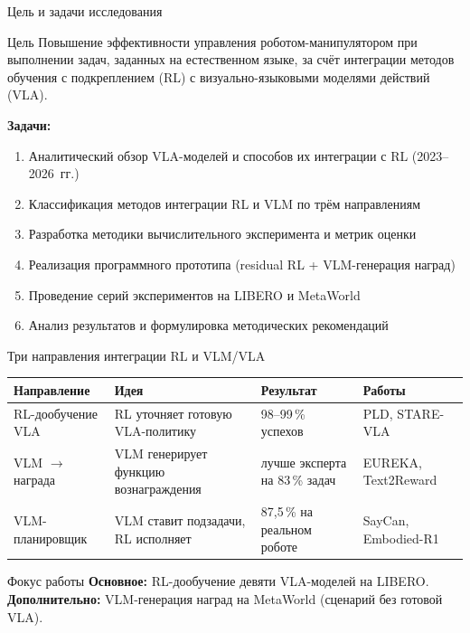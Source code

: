 \documentclass[aspectratio=169,13pt]{beamer}
\begin{document}
\begin{frame}{Цель и задачи исследования}
  \begin{alertblock}{Цель}
    Повышение эффективности управления роботом-манипулятором при выполнении задач, заданных на естественном языке, за счёт интеграции методов обучения с подкреплением (RL) с визуально-языковыми моделями действий (VLA).
  \end{alertblock}
  \vspace{2pt}
  \textbf{Задачи:}
  \begin{enumerate}\setlength\itemsep{2pt}\small
    \item Аналитический обзор VLA-моделей и способов их интеграции с RL (2023--2026~гг.)
    \item Классификация методов интеграции RL и VLM по трём направлениям
    \item Разработка методики вычислительного эксперимента и метрик оценки
    \item Реализация программного прототипа (residual RL + VLM-генерация наград)
    \item Проведение серий экспериментов на LIBERO и MetaWorld
    \item Анализ результатов и формулировка методических рекомендаций
  \end{enumerate}
\end{frame}

\begin{frame}{Три направления интеграции RL и VLM/VLA}
  \footnotesize
  \setlength{\tabcolsep}{4pt}
  \begin{tabular}{p{}p{}p{}p{}}
    \toprule
    \textbf{Направление} & \textbf{Идея} & \textbf{Результат} & \textbf{Работы} \\
    \midrule
    RL-дообучение VLA & RL уточняет готовую VLA-политику & 98--99\,\% успехов & PLD, STARE-VLA \\[3pt]
    VLM $\to$ награда & VLM генерирует функцию вознаграждения & лучше эксперта на 83\,\% задач & EUREKA, Text2Reward \\[3pt]
    VLM-планировщик & VLM ставит подзадачи, RL исполняет & 87,5\,\% на реальном роботе & SayCan, Embodied-R1 \\
    \bottomrule
  \end{tabular}
  \vspace{6pt}
  \begin{alertblock}{Фокус работы}
    \small \textbf{Основное:} RL-дообучение девяти VLA-моделей на LIBERO.\;
    \textbf{Дополнительно:} VLM-генерация наград на MetaWorld (сценарий без готовой VLA).
  \end{alertblock}
\end{frame}
\end{document}
